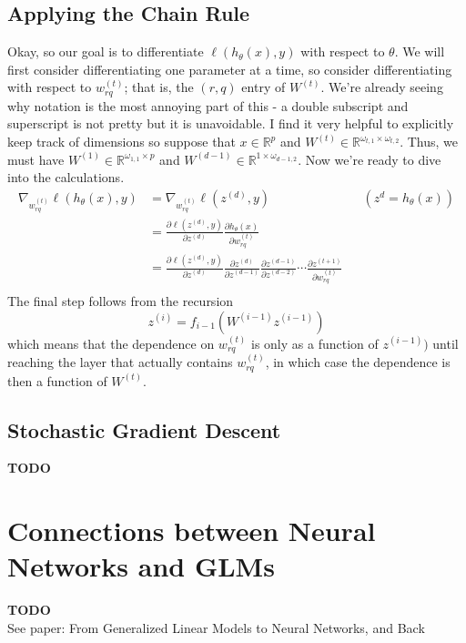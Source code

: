 \documentclass[12pt]{article}
\newcommand{\R}{\mathcal{R}}
\def\R{\mathbb{R}}
\begin{document}
\subsection{Applying the Chain Rule}
Okay, so our goal is to differentiate $\ell(h_\theta(x), y)$ with respect to $\theta$. We will first consider differentiating one parameter at a time, so consider differentiating with 
respect to $w^{(t)}_{rq}$; that is, the $(r, q)$ entry of $W^{(t)}$. We're already seeing why notation is the most annoying part of this - a double subscript and superscript is not pretty 
but it is unavoidable. I find it very helpful to explicitly keep track of dimensions so suppose that $x \in \R^p$ and $W^{(t)} \in \R^{\omega_{t, 1} \times \omega_{t, 2}}$. Thus, we must have 
$W^{(1)} \in \R^{\omega_{1, 1} \times p}$ and $W^{(d - 1)} \in \R^{1 \times \omega_{d-1, 2}}$. Now we're ready to dive into the calculations. 
\begin{align*}
\nabla_{w_{rq}^{(t)}} \ell(h_\theta(x), y) &= \nabla_{w_{rq}^{(t)}} \ell(z^{(d)}, y) && \left(z^{d} = h_\theta(x) \right) \\ 
							   &= \frac{\partial \ell(z^{(d)}, y)}{\partial z^{(d)}} \frac{\partial h_\theta(x)}{\partial w_{rq}^{(t)}} \\
							   &= \frac{\partial \ell(z^{(d)}, y)}{\partial z^{(d)}} \frac{\partial z^{(d)}}{\partial z^{(d - 1)}} \frac{\partial z^{(d - 1)}}{\partial z^{(d - 2)}} \cdots \frac{\partial z^{(t + 1)}}{\partial w_{rq}^{(t)}}\\
\end{align*}
The final step follows from the recursion
\[z^{(i)} = f_{i - 1}(W^{(i - 1)}z^{(i - 1)})\]
which means that the dependence on $w^{(t)}_{rq}$ is only as a function of $z^{(i - 1)})$ until reaching the layer that actually contains $w^{(t)}_{rq}$, in which case the dependence is 
then a function of $W^{(t)}$. 

\subsection{Stochastic Gradient Descent}
\textbf{TODO}


\section{Connections between Neural Networks and GLMs}
\textbf{TODO}\\
See paper: From Generalized Linear Models to Neural Networks, and Back
\end{document}
